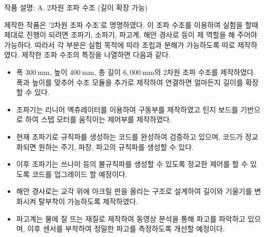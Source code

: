 \documentclass[Junlampaper, portrait]{Julam_PosterK}
\begin{document}
\begin{poster}
\begin{posterbox}[name=wtank,span=2,column=1,row=0] {작품 설명: A. 2차원 조파 수조 (길이 확장 가능)}
\newline
\scriptsize 제작한 작품은 '2차원 조파 수조'로 명명하였다. 이 조파 수조를 이용하여 실험을 할때 제대로 진행이 되려면 조파기, 소파기, 파고계, 해안 경사로 등이 제 역할을 해 주어야 가능하다. 따라서 각 부분은 실험 목적에 따라 조립과 분해가 가능하도록 따로 제작하였다. 제작한 조파 수조의 특징을 나열하면 다음과 같다.
\begin{itemize}
    \item 폭 $300~\mathrm{mm}$, 높이 $400~\mathrm{mm}$, 총 길이 $6,000~\mathrm{mm}$의 2차원 조파 수조를 제작하였다. 폭과 높이를 맞추어 수조 모듈을 추가로 제작하여 연결하면 얼마든지 길이를 확장할 수 있다. 
    \item 조파기는 리니어 엑츄레이터를 이용하여 구동부를 제작하였고 틴지 보드를 기반으로 하여 스텝 모터를 움직이는 제어부를 제작하였다. 
    \item 현재 조파기로 규칙파를 생성하는 코드를 완성하여 검증하고 있으며, 코드가 정교화되면 원하는 주기, 파장, 파고의 규칙파를 생성할 수 있다. 
    \item 이후 조파기는 쓰나미 등의 불규칙파를 생성할 수 있도록 정교한 제어를 할 수 있도록 코드를 업그레이드 할 예정이다. 
    \item 해안 경사로는 교각 위에 아크릴 판을 올리는 구조로 설계하여 길이와 기울기를 변화시켜 탈부착이 가능하도록 제작하였다. 
    \item 파고계는 물에 잘 뜨는 재질로 제작하여 동영상 분석을 통해 파고를 파악하고 있으며, 이후 센서를 부착하여 정밀한 파고를 측정하도록 개선할 예정이다.
\end{itemize}


\end{posterbox}
\end{poster}
\end{document}
